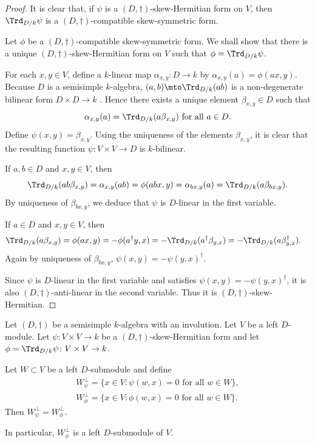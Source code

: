 \begin{proof}
It is clear that, if $\psi$ is a $(D,\dag)$-skew-Hermitian form on $V$, then $\Trd_{D/k} \psi$ is a $(D,\dag)$-compatible skew-symmetric form.

Let $\phi$ be a $(D,\dag)$-compatible skew-symmetric form.
We shall show that there is a unique $(D,\dag)$-skew-Hermitian form on $V$ such that $\phi = \Trd_{D/k} \psi$.

For each $x,y \in V$, define a $k$-linear map $\alpha_{x,y} \colon D \to k$ by $\alpha_{x,y}(a) = \phi(ax, y)$.
Because $D$ is a semisimple $k$-algebra, $(a,b) \mto \Trd_{D/k}(ab)$ is a non-degenerate bilinear form $D \times D \to k$ \cite[Th.\,9.26]{Rei75}.
Hence there exists a unique element $\beta_{x,y} \in D$ such that
\[
\alpha_{x,y}(a) = \Trd_{D/k}(a\beta_{x,y}) \text{ for all } a \in D.
\]
Define $\psi(x,y) = \beta_{x,y}$.
Using the uniqueness of the elements $\beta_{x,y}$, it is clear that the resulting function $\psi \colon V \times V \to D$ is $k$-bilinear.

If $a, b \in D$ and $x,y \in V$, then
\[
\Trd_{D/k}(ab\beta_{x,y}) = \alpha_{x,y}(ab) = \phi(abx, y) = \alpha_{bx,y}(a) = \Trd_{D/k}(a\beta_{bx,y}).
\]
By uniqueness of $\beta_{bx,y}$, we deduce that $\psi$ is $D$-linear in the first variable.

If $a \in D$ and $x, y \in V$, then
\begin{align*}
\Trd_{D/k}(a\beta_{x,y})
& = \phi(ax, y) = -\phi(a^\dag y, x)
= -\Trd_{D/k}(a^\dag \beta_{y, x}) = -\Trd_{D/k}(a\beta_{y,x}^\dag).
\end{align*}
Again by uniqueness of $\beta_{bx,y}$, $\psi(x,y) = -\psi(y,x)^\dag$.

Since $\psi$ is $D$-linear in the first variable and satisfies $\psi(x,y) = -\psi(y,x)^\dag$, it is also $(D,\dag)$-anti-linear in the second variable.
Thus it is $(D,\dag)$-skew-Hermitian.
\end{proof}

\begin{lemma} \label{orthog-complements}
Let $(D, \dag)$ be a semisimple $k$-algebra with an involution.
Let $V$ be a left $D$-module.
Let $\psi \colon V \times V \to k$ be a $(D,\dag)$-skew-Hermitian form and let $\phi = \Trd_{D/k} \psi \colon V \times V \to k$.

Let $W \subset V$ be a left $D$-submodule and define
\begin{gather*}
W_\psi^\perp = \{ x \in V : \psi(w,x) = 0 \text{ for all } w \in W \},
\\ W_\phi^\perp = \{ x \in V : \phi(w,x) = 0 \text{ for all } w \in W \}.
\end{gather*}
Then $W_\psi^\perp = W_\phi^\perp$.

In particular, $W_\phi^\perp$ is a left $D$-submodule of $V$.
\end{lemma}

